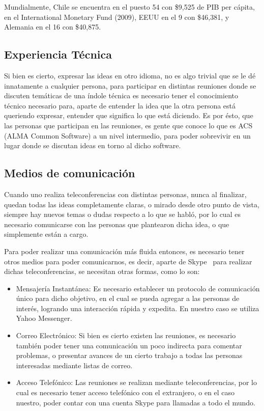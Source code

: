Mundialmente, Chile se encuentra en el puesto 54 con \$9,525 de PIB per cápita,
en el International Monetary Fund (2009)\cite{IMF}\cite{IMFpercapita}, EEUU en
el 9 con \$46,381, y Alemania en el 16 con \$40,875.



\subsection{Experiencia Técnica}
Si bien es cierto, expresar las ideas en otro idioma, no es algo
trivial que se le dé innatamente a cualquier persona, para participar
en distintas reuniones donde se discuten temáticas de una índole técnica
es necesario tener el conocimiento técnico necesario para, aparte de
entender la idea que la otra persona está queriendo expresar, entender
que significa lo que está diciendo.
Es por ésto, que las personas que participan en las reuniones,
es gente que conoce lo que es ACS (ALMA Common Software) a un nivel
intermedio, para poder sobrevivir en un lugar donde se discutan ideas
en torno al dicho software.

\subsection{Medios de comunicación}
Cuando uno realiza teleconferencias con distintas personas,
nunca al finalizar, quedan todas las ideas completamente claras,
o mirado desde otro punto de vista, siempre hay nuevos temas
o dudas respecto a lo que se habló, por lo cual es necesario
comunicarse con las personas que plantearon dicha idea, o que
simplemente están a cargo.

Para poder realizar una comunicación más fluida entonces,
es necesario tener otros medios para poder comunicarnos,
es decir, aparte de Skype~\cite{Skype} para realizar
dichas teleconferencias, se necesitan otras formas, como lo son:
\begin{itemize}
   \item Mensajería Instantánea: Es necesario establecer un protocolo de comunicación
		único para dicho objetivo, en el cual se pueda agregar a las personas de interés, logrando
		una interacción rápida y expedita. En nuestro caso se utiliza Yahoo Messenger.
   \item Correo Electrónico: Si bien es cierto existen las reuniones, es necesario también
		poder tener una comunicación un poco indirecta para comentar problemas, o presentar
		avances de un cierto trabajo a todas las personas interesadas mediante listas de correo.
   \item Acceso Telefónico: Las reuniones se realizan mediante teleconferencias, por lo cual
		es necesario tener acceso telefónico con el extranjero, o en el caso nuestro, poder
		contar con una cuenta Skype para llamadas a todo el mundo.
\end{itemize}

